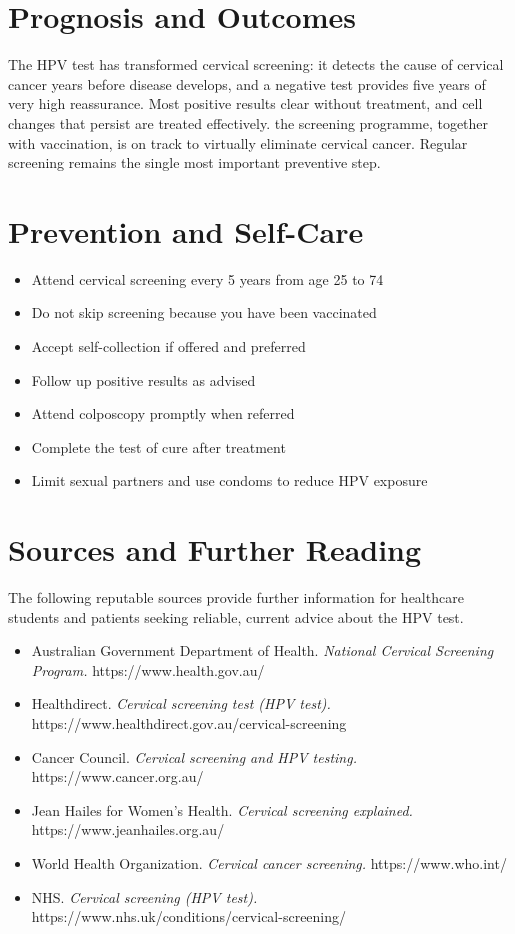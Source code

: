 \section*{Prognosis and Outcomes}
The HPV test has transformed cervical screening: it detects the cause of cervical cancer years before disease develops, and a negative test provides five years of very high reassurance. Most positive results clear without treatment, and cell changes that persist are treated effectively. the screening programme, together with vaccination, is on track to virtually eliminate cervical cancer. Regular screening remains the single most important preventive step.

\section*{Prevention and Self-Care}
\begin{itemize}
    \item Attend cervical screening every 5 years from age 25 to 74
    \item Do not skip screening because you have been vaccinated
    \item Accept self-collection if offered and preferred
    \item Follow up positive results as advised
    \item Attend colposcopy promptly when referred
    \item Complete the test of cure after treatment
    \item Limit sexual partners and use condoms to reduce HPV exposure
\end{itemize}

\section*{Sources and Further Reading}
The following reputable sources provide further information for healthcare students and patients seeking reliable, current advice about the HPV test.

\begin{itemize}
    \item Australian Government Department of Health. \textit{National Cervical Screening Program.} https://www.health.gov.au/
    \item Healthdirect. \textit{Cervical screening test (HPV test).} https://www.healthdirect.gov.au/cervical-screening
    \item Cancer Council. \textit{Cervical screening and HPV testing.} https://www.cancer.org.au/
    \item Jean Hailes for Women's Health. \textit{Cervical screening explained.} https://www.jeanhailes.org.au/
    \item World Health Organization. \textit{Cervical cancer screening.} https://www.who.int/
    \item NHS. \textit{Cervical screening (HPV test).} https://www.nhs.uk/conditions/cervical-screening/
\end{itemize}
